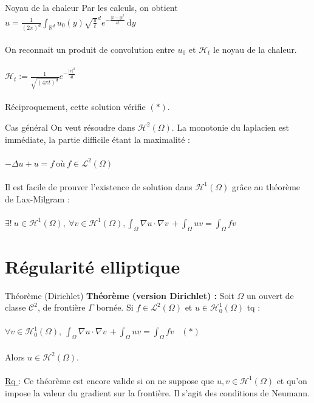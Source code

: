 \documentclass[10pt]{beamer}
\begin{document}
\begin{frame}{Noyau de la chaleur}
Par les calculs, on obtient $u=\frac{1}{(2\pi)^d}  \displaystyle \int_{\mathbb{R}^d} u_0(y)\sqrt{\frac{\pi}{t}}^d e^{-\frac{|x-y|^2}{4t}} \, \mathrm{d}y $\\ ~ \\ 
On reconnait un produit de convolution entre $u_0$ et $\mathcal{H}_t$ le noyau de la chaleur. \\ ~ \\ 

$\mathcal{H}_t := \frac{1}{\sqrt{(4\pi t)^d}} e^{-\frac{|x|^2}{4t}}$ \\ ~ \\ 

Réciproquement, cette solution vérifie $(*)$.
\end{frame}


\begin{frame}{Cas général}
On veut résoudre dans $\mathcal{H}^2(\Omega)$. La monotonie du laplacien est immédiate, la partie difficile étant la maximalité : \\ ~ \\ 
$-\Delta u +u = f \ \text{où} \ f \in \mathcal{L}^2(\Omega) $   \\ ~ \\ 
Il est facile de prouver l'existence de solution dans $\mathcal{H}^1(\Omega)$ grâce au théorème de Lax-Milgram :\\ ~ \\ 
$\exists !\  u\in\mathcal{H}^1(\Omega), \ \forall v \in \mathcal{H}^1(\Omega), \displaystyle \int_{\Omega} \nabla u \cdot \nabla v \,  + \int_{\Omega} u v =  \int_{\Omega} f v  \, $
\end{frame}



\section{Régularité elliptique}

\begin{frame}{Théorème (Dirichlet)}
\textbf{Théorème (version Dirichlet) :} Soit $\Omega$ un ouvert de classe $\mathcal{C}^2$, de frontière $\Gamma$ bornée. Si $f \in \mathcal{L}^2(\Omega)$ et $u\in \mathcal{H}^1_0(\Omega)$ tq : \\ ~ \\  $\forall v \in \mathcal{H}^1_0(\Omega), \ \displaystyle \int_{\Omega} \nabla u \cdot \nabla v \,  + \int_{\Omega} u v =  \int_{\Omega} f v  \, \ \ \ (*) $\\ ~ \\ 
Alors $u\in \mathcal{H}^2(\Omega)$. \\~\\

\underline{Rq }: Ce théorème est encore valide si on ne suppose que $u,v\in\mathcal{H}^1(\Omega)$ et qu'on impose la valeur du gradient sur la frontière. Il s'agit des conditions de Neumann.
\end{frame}
\end{document}
